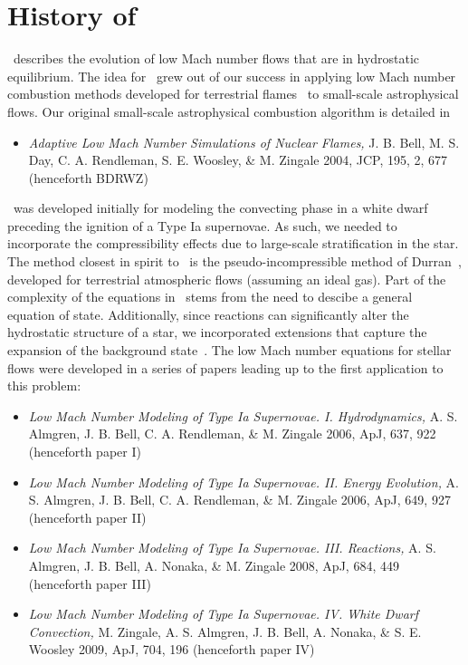 \section{History of \maestro}

\maestro\ describes the evolution of low Mach number flows that are in
hydrostatic equilibrium.  The idea for \maestro\ grew out of our success
in applying low Mach number combustion methods developed for
terrestrial flames~\cite{DayBell00} to small-scale
astrophysical flows.  Our original small-scale astrophysical
combustion algorithm is detailed in
\begin{itemize}
\item {\em Adaptive Low Mach Number Simulations of Nuclear Flames,}
J. B. Bell, M. S. Day, C. A. Rendleman, S. E. Woosley, \& M. Zingale
2004, JCP, 195, 2, 677 (henceforth BDRWZ)
\end{itemize}

\noindent \maestro\ was developed initially for modeling the convecting
phase in a white dwarf preceding the ignition of a Type Ia supernovae.
As such, we needed to incorporate the compressibility effects due to
large-scale stratification in the star.  The method closest in spirit
to \maestro\ is the pseudo-incompressible method of
Durran~\cite{durran}, developed for terrestrial atmospheric flows
(assuming an ideal gas).  Part of the complexity of the equations in
\maestro\ stems from the need to descibe a general equation of state.
Additionally, since reactions can significantly alter the hydrostatic
structure of a star, we incorporated extensions that capture the
expansion of the background state~\cite{almgren:2000}.  The low Mach
number equations for stellar flows were developed in a series of
papers leading up to the first application to this problem:
\begin{itemize}
\item {\em Low Mach Number Modeling of Type Ia
  Supernovae. I. Hydrodynamics,} A. S. Almgren, J. B. Bell, 
  C. A. Rendleman, \& M. Zingale 2006, ApJ, 637, 922 (henceforth
  paper I)
\item {\em Low Mach Number Modeling of Type Ia Supernovae. II. Energy
  Evolution,} A. S. Almgren, J. B. Bell, C. A. Rendleman, \& M. Zingale
  2006, ApJ, 649, 927 (henceforth paper II)
\item {\em Low Mach Number Modeling of Type Ia Supernovae. III. Reactions,}
  A. S. Almgren, J. B. Bell, A. Nonaka, \& M. Zingale
  2008, ApJ, 684, 449 (henceforth paper III)
\item {\em Low Mach Number Modeling of Type Ia Supernovae. IV. White Dwarf Convection,}
  M. Zingale, A. S. Almgren, J. B. Bell, A. Nonaka, \& S. E. Woosley
  2009, ApJ, 704, 196 (henceforth paper IV)
\end{itemize}

